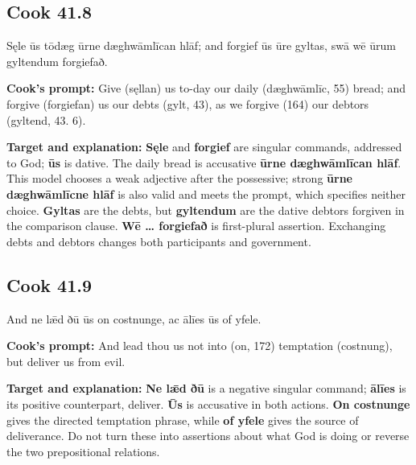 \par\begin{minipage}{\linewidth}\raggedright
\subsection*{Cook 41.8}

Sęle ūs tōdæg ūrne dæghwāmlīcan hlāf; and forgief ūs ūre gyltas, swā wē ūrum gyltendum forgiefað.

\textbf{Cook's prompt:} Give (sęllan) us to-day our daily (dæghwāmlīc, 55) bread; and forgive (forgiefan) us our debts (gylt, 43), as we forgive (164) our debtors (gyltend, 43. 6).

\textbf{Target and explanation:} \textbf{Sęle} and \textbf{forgief} are singular commands, addressed to God; \textbf{ūs} is dative. The daily bread is accusative \textbf{ūrne dæghwāmlīcan hlāf}. This model chooses a weak adjective after the possessive; strong \textbf{ūrne dæghwāmlīcne hlāf} is also valid and meets the prompt, which specifies neither choice. \textbf{Gyltas} are the debts, but \textbf{gyltendum} are the dative debtors forgiven in the comparison clause. \textbf{Wē … forgiefað} is first-plural assertion. Exchanging debts and debtors changes both participants and government.

\end{minipage}\par\addvspace{4pt}

\par\begin{minipage}{\linewidth}\raggedright
\subsection*{Cook 41.9}

And ne lǣd ðū ūs on costnunge, ac ālīes ūs of yfele.

\textbf{Cook's prompt:} And lead thou us not into (on, 172) temptation (costnung), but deliver us from evil.

\textbf{Target and explanation:} \textbf{Ne lǣd ðū} is a negative singular command; \textbf{ālīes} is its positive counterpart, deliver. \textbf{Ūs} is accusative in both actions. \textbf{On costnunge} gives the directed temptation phrase, while \textbf{of yfele} gives the source of deliverance. Do not turn these into assertions about what God is doing or reverse the two prepositional relations.

\end{minipage}\par\addvspace{4pt}

